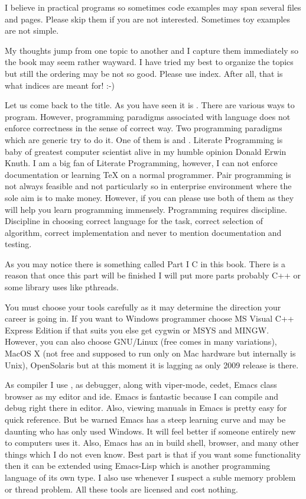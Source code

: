 I believe in practical programs so sometimes code examples may span several
files and pages. Please skip them if you are not interested. Sometimes toy
examples are not simple.

My thoughts jump from one topic to another and I capture them immediately so
the book may seem rather wayward. I have tried my best to organize the topics
but still the ordering may be not so good. Please use index. After all, that 
is what indices are meant for! :-)

Let us come back to the title. As you have seen it is . There are various ways to program. However, programming paradigms
associated with language does not enforce correctness in the sense of correct
way. Two programming paradigms which are generic try to do it. One of them is
 and . Literate
Programming is baby of greatest computer scientist alive in my humble opinion
Donald Erwin Knuth. I am a big fan of Literate Programming, however, I can not
enforce documentation or learning \TeX{} on a normal programmer. Pair
programming is not always feasible and not particularly so in enterprise
environment where the sole aim is to make money. However, if you can
please use both of them as they will help you learn programming
immensely. Programming requires discipline. Discipline in choosing
correct language for the task, correct selection of algorithm, correct
implementation and never to mention documentation and testing.

As you may notice there is something called Part I C in this
book. There is a reason that once this part will be finished I will
put more parts probably C++ or some library uses like pthreads.

\subject{Tools}
You must choose your tools carefully as it may determine the direction
your career is going in. If you want to Windows programmer choose MS
Visual C++ Express Edition if that suits you else get cygwin or MSYS
and MINGW. However, you can also choose GNU/Linux (free comes in many
variations), MacOS X (not free and supposed to run only on Mac
hardware but internally is Unix), OpenSolaris but at this moment it is
lagging as only 2009 release is there.

As compiler I use ,  as debugger, 
along with viper-mode, cedet, Emacs class browser as my editor and
ide. Emacs is fantastic because I can compile and debug right there in
editor. Also, viewing manuals in Emacs is pretty easy for quick
reference. But be warned Emacs has a steep learning curve and may be
daunting who has only used Windows. It will feel better if someone
entirely new to computers uses it. Also, Emacs has an in build shell,
browser, and many other things which I do not even know. Best part is
that if you want some functionality then it can be extended using
Emacs-Lisp which is another programming language of its own type.
I also use  whenever I suspect a suble memory problem
or thread problem. All these tools are licensed and cost nothing.

